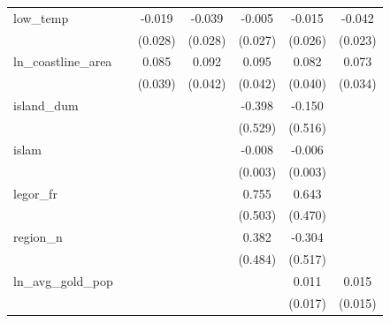 \begin{table}[htbp]
\begin{tabular}{l*{6}{c}}
\addlinespace
low\_temp    &                     &      -0.019         &      -0.039         &      -0.005         &      -0.015         &      -0.042\sym{*}  \\
            &                     &     (0.028)         &     (0.028)         &     (0.027)         &     (0.026)         &     (0.023)         \\
\addlinespace
ln\_coastline\_area&                     &       0.085\sym{**} &       0.092\sym{**} &       0.095\sym{**} &       0.082\sym{**} &       0.073\sym{**} \\
            &                     &     (0.039)         &     (0.042)         &     (0.042)         &     (0.040)         &     (0.034)         \\
\addlinespace
island\_dum  &                     &                     &                     &      -0.398         &      -0.150         &                     \\
            &                     &                     &                     &     (0.529)         &     (0.516)         &                     \\
\addlinespace
islam       &                     &                     &                     &      -0.008\sym{***}&      -0.006\sym{*}  &                     \\
            &                     &                     &                     &     (0.003)         &     (0.003)         &                     \\
\addlinespace
legor\_fr    &                     &                     &                     &       0.755         &       0.643         &                     \\
            &                     &                     &                     &     (0.503)         &     (0.470)         &                     \\
\addlinespace
region\_n    &                     &                     &                     &       0.382         &      -0.304         &                     \\
            &                     &                     &                     &     (0.484)         &     (0.517)         &                     \\
\addlinespace
ln\_avg\_gold\_pop&                     &                     &                     &                     &       0.011         &       0.015         \\
            &                     &                     &                     &                     &     (0.017)         &     (0.015)         \\

\end{tabular}
\end{table}
